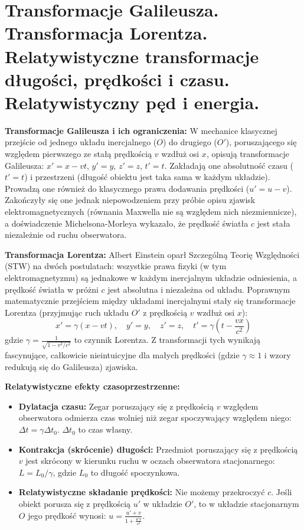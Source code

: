 \documentclass[11pt, a4paper]{article}
\begin{document}
\section{Transformacje Galileusza. Transformacja Lorentza. Relatywistyczne transformacje długości, prędkości i czasu. Relatywistyczny pęd i energia.}

\textbf{Transformacje Galileusza i ich ograniczenia:}
W mechanice klasycznej przejście od jednego układu inercjalnego ($O$) do drugiego ($O'$), poruszającego się względem pierwszego ze stałą prędkością $v$ wzdłuż osi $x$, opisują transformacje Galileusza: $x' = x - vt$, $y' = y$, $z' = z$, $t' = t$. Zakładają one absolutność czasu ($t'=t$) i przestrzeni (długość obiektu jest taka sama w każdym układzie). Prowadzą one również do klasycznego prawa dodawania prędkości ($u' = u - v$). Zakończyły się one jednak niepowodzeniem przy próbie opisu zjawisk elektromagnetycznych (równania Maxwella nie są względem nich niezmiennicze), a doświadczenie Michelsona-Morleya wykazało, że prędkość światła $c$ jest stała niezależnie od ruchu obserwatora.

\textbf{Transformacja Lorentza:}
Albert Einstein oparł Szczególną Teorię Względności (STW) na dwóch postulatach: wszystkie prawa fizyki (w tym elektromagnetyzmu) są jednakowe w każdym inercjalnym układzie odniesienia, a prędkość światła w próżni $c$ jest absolutna i niezależna od układu. Poprawnym matematycznie przejściem między układami inercjalnymi stały się transformacje Lorentza (przyjmując ruch układu $O'$ z prędkością $v$ wzdłuż osi $x$):
\[
x' = \gamma(x - vt), \quad y' = y, \quad z' = z, \quad t' = \gamma\left(t - \frac{vx}{c^2}\right)
\]
gdzie $\gamma = \frac{1}{\sqrt{1 - v^2/c^2}}$ to czynnik Lorentza. Z transformacji tych wynikają fascynujące, całkowicie nieintuicyjne dla małych prędkości (gdzie $\gamma \approx 1$ i wzory redukują się do Galileusza) zjawiska.

\textbf{Relatywistyczne efekty czasoprzestrzenne:}
\begin{itemize}
    \item \textbf{Dylatacja czasu:} Zegar poruszający się z prędkością $v$ względem obserwatora odmierza czas wolniej niż zegar spoczywający względem niego: $\Delta t = \gamma \Delta t_0$. $\Delta t_0$ to czas własny.
    \item \textbf{Kontrakcja (skrócenie) długości:} Przedmiot poruszający się z prędkością $v$ jest skrócony w kierunku ruchu w oczach obserwatora stacjonarnego: $L = L_0 / \gamma$, gdzie $L_0$ to długość spoczynkowa.
    \item \textbf{Relatywistyczne składanie prędkości:} Nie możemy przekroczyć $c$. Jeśli obiekt porusza się z prędkością $u'$ w układzie $O'$, to w układzie stacjonarnym $O$ jego prędkość wynosi: $u = \frac{u' + v}{1 + \frac{u' v}{c^2}}$.
\end{itemize}
\end{document}
